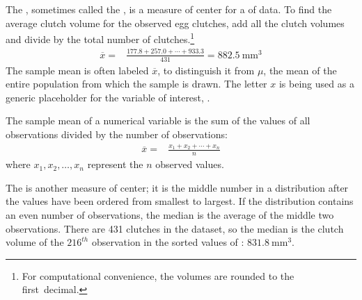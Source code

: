 The , sometimes called the , is a measure of center for a  of data. To find the average clutch volume for the observed egg clutches, add all the clutch volumes and divide by the total number of clutches.\footnote{For computational convenience, the volumes are rounded to the first~decimal.}
\begin{align*}
\overline{x} =& \frac{177.8 + 257.0 + \cdots + 933.3}{431} = 882.5\ \textrm{mm}^{3}
\end{align*}
The sample mean is often labeled $\overline{x}$, to distinguish it from $\mu$, the mean of the entire population from which the sample is drawn. The letter $x$ is being used as a generic placeholder for the variable of interest, .

\begin{termBox}{%
		The sample mean of a numerical variable is the sum of the values of all observations divided by the number of observations:
		\begin{align}
		\overline{x} =& \frac{x_1+x_2+\cdots+x_n}{n}
		\label{samplemeanEquation}
		\end{align}
		where $x_1, x_2, \dots, x_n$ represent the $n$ observed values.}
\end{termBox}

The  is another measure of center; it is the middle number in a distribution after the values have been ordered from smallest to largest. If the distribution contains an even number of observations, the median is the average of the middle two observations. There are 431 clutches in the dataset, so the median is the clutch volume of the $216^{th}$ observation in the sorted values of : $831.8\ \textrm{mm}^{3}$.

